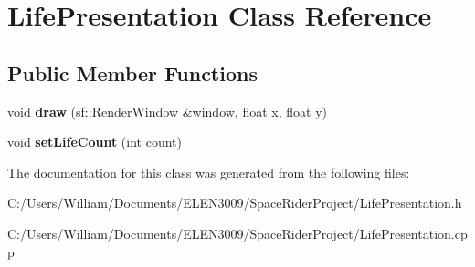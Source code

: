 \hypertarget{class_life_presentation}{}\section{Life\+Presentation Class Reference}
\label{class_life_presentation}
\subsection*{Public Member Functions}
\begin{DoxyCompactItemize}
\item 
\mbox{\label{class_life_presentation_a78c9fdc72d78cb619a885d251996c3ff}} 
void {\bfseries draw} (sf\+::\+Render\+Window \&window, float x, float y)
\item 
\mbox{\label{class_life_presentation_a4baba880082d5281a2fcb6b19d178418}} 
void {\bfseries set\+Life\+Count} (int count)
\end{DoxyCompactItemize}


The documentation for this class was generated from the following files\+:\begin{DoxyCompactItemize}
\item 
C\+:/\+Users/\+William/\+Documents/\+E\+L\+E\+N3009/\+Space\+Rider\+Project/Life\+Presentation.\+h\item 
C\+:/\+Users/\+William/\+Documents/\+E\+L\+E\+N3009/\+Space\+Rider\+Project/Life\+Presentation.\+cpp\end{DoxyCompactItemize}
